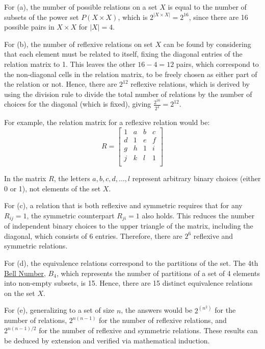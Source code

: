     \begin{solution}
        For (a), the number of possible relations on a set $X$ is equal to the number of subsets of the power set $P(X \times X)$, which is $2^{|X \times X|} = 2^{16}$, since there are 16 possible pairs in $X \times X$ for $|X| = 4$.
        
        For (b), the number of reflexive relations on set $X$ can be found by considering that each element must be related to itself, fixing the diagonal entries of the relation matrix to 1. This leaves the other $16 - 4 = 12$ pairs, which correspond to the non-diagonal cells in the relation matrix, to be freely chosen as either part of the relation or not. Hence, there are $2^{12}$ reflexive relations, which is derived by using the division rule to divide the total number of relations by the number of choices for the diagonal (which is fixed), giving $\frac{2^{16}}{2^4} = 2^{12}$.
        
        For example, the relation matrix for a reflexive relation would be:
        $$
        R = \begin{bmatrix}
        1 & a & b & c \\
        d & 1 & e & f \\
        g & h & 1 & i \\
        j & k & l & 1 \\
        \end{bmatrix}
        $$
        \begin{remark}
        In the matrix $R$, the letters $a, b, c, d, \ldots, l$ represent arbitrary binary choices (either 0 or 1), not elements of the set $X$.
        \end{remark}
        
        For (c), a relation that is both reflexive and symmetric requires that for any $R_{ij} = 1$, the symmetric counterpart $R_{ji} = 1$ also holds. This reduces the number of independent binary choices to the upper triangle of the matrix, including the diagonal, which consists of 6 entries. Therefore, there are $2^6$ reflexive and symmetric relations.
        
        For (d), the equivalence relations correspond to the partitions of the set. The 4th \href{https://math.libretexts.org/Bookshelves/Combinatorics_and_Discrete_Mathematics/Combinatorics_and_Graph_Theory_(Guichard)/01%3A_Fundamentals/1.05%3A_Bell_Numbers}{Bell Number}, $B_4$, which represents the number of partitions of a set of 4 elements into non-empty subsets, is 15. Hence, there are 15 distinct equivalence relations on the set $X$.
        
        For (e), generalizing to a set of size $n$, the answers would be $2^{(n^2)}$ for the number of relations, $2^{n(n-1)}$ for the number of reflexive relations, and $2^{n(n-1)/2}$ for the number of reflexive and symmetric relations. These results can be deduced by extension and verified via mathematical induction.
        \end{solution}

